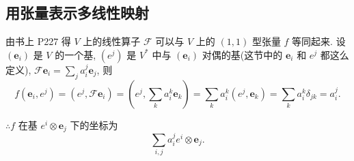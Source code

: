 \documentclass{ctexart}
\begin{document}
\subsection{用张量表示多线性映射}
由书上 P227 得 $V$ 上的线性算子 $\mathcal{F}$ 可以与 $V$ 上的 $(1,1)$ 型张量 $f$ 等同起来. 设 $(\boldsymbol{e}_i)$ 是 $V$ 的一个基, $(e^j)$ 是 $V^*$ 中与 $(\boldsymbol{e}_i)$ 对偶的基(这节中的 $\boldsymbol{e}_i$ 和 $e^j$ 都这么定义), $\mathcal{F}\boldsymbol{e}_i=\sum\limits_ja_i^j\boldsymbol{e}_j$, 则
\[f(\boldsymbol{e}_i,e^j)=(e^j,\mathcal{F}\boldsymbol{e}_i)=\left(e^j,\sum\limits_ka_i^k\boldsymbol{e}_k\right)=\sum\limits_ka_i^k(e^j,\boldsymbol{e}_k)=\sum\limits_ka_i^k\delta_{jk}=a_i^j.\]

$\therefore f$ 在基 $e^i\otimes\boldsymbol{e}_j$ 下的坐标为
\[\sum\limits_{i,j}a_i^je^i\otimes\boldsymbol{e}_j.\]
\end{document}
